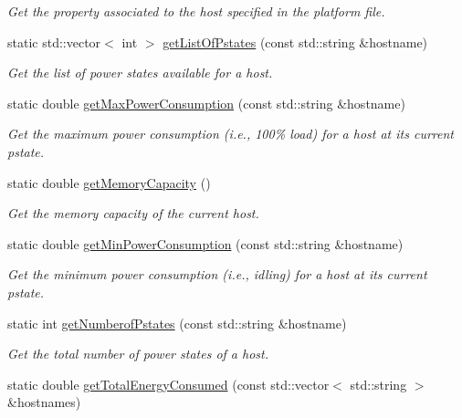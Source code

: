 \begin{DoxyCompactItemize}
\begin{DoxyCompactList}\small\item\em Get the property associated to the host specified in the platform file. \end{DoxyCompactList}\item 
static std\+::vector$<$ int $>$ \hyperlink{classwrench_1_1_s4_u___simulation_a9b077f7a49a17ff009891dce42910b48}{get\+List\+Of\+Pstates} (const std\+::string \&hostname)
\begin{DoxyCompactList}\small\item\em Get the list of power states available for a host. \end{DoxyCompactList}\item 
static double \hyperlink{classwrench_1_1_s4_u___simulation_a386ca90dcf205eb01fd145f837dbe153}{get\+Max\+Power\+Consumption} (const std\+::string \&hostname)
\begin{DoxyCompactList}\small\item\em Get the maximum power consumption (i.\+e., 100\% load) for a host at its current pstate. \end{DoxyCompactList}\item 
static double \hyperlink{classwrench_1_1_s4_u___simulation_a3336a395e2463b4fcfd921d9fec190f9}{get\+Memory\+Capacity} ()
\begin{DoxyCompactList}\small\item\em Get the memory capacity of the current host. \end{DoxyCompactList}\item 
static double \hyperlink{classwrench_1_1_s4_u___simulation_a833e019cc24b6e8d99446211d4061b13}{get\+Min\+Power\+Consumption} (const std\+::string \&hostname)
\begin{DoxyCompactList}\small\item\em Get the minimum power consumption (i.\+e., idling) for a host at its current pstate. \end{DoxyCompactList}\item 
static int \hyperlink{classwrench_1_1_s4_u___simulation_ae3ad786868ba97b98e4414c521eefabf}{get\+Numberof\+Pstates} (const std\+::string \&hostname)
\begin{DoxyCompactList}\small\item\em Get the total number of power states of a host. \end{DoxyCompactList}\item 
static double \hyperlink{classwrench_1_1_s4_u___simulation_a159cc9630614cf8143e5131c3d38a2ed}{get\+Total\+Energy\+Consumed} (const std\+::vector$<$ std\+::string $>$ \&hostnames)

\end{DoxyCompactItemize}
